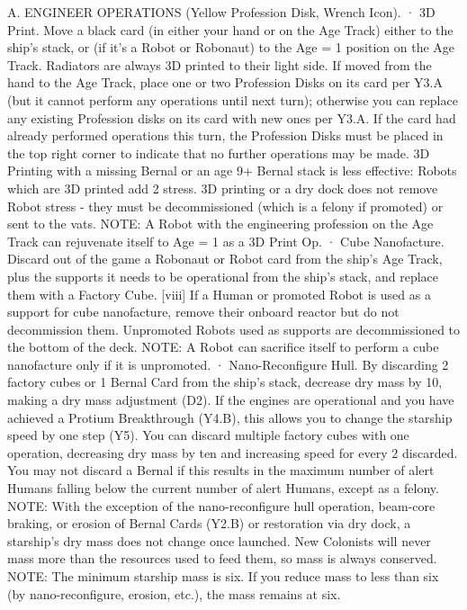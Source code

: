 \documentclass[a4paper]{book}
\begin{document}
A. ENGINEER OPERATIONS (Yellow Profession Disk, Wrench Icon).
·       3D Print. Move a black card (in either your hand or on the Age Track) either to the ship’s stack, or (if it’s a Robot or Robonaut) to the Age = 1 position on the Age Track. Radiators are always 3D printed to their light side. If moved from the hand to the Age Track, place one or two Profession Disks on its card per Y3.A (but it cannot perform any operations until next turn); otherwise you can replace any existing Profession disks on its card with new ones per Y3.A. If the card had already performed operations this turn, the Profession Disks must be placed in the top right corner to indicate that no further operations may be made. 3D Printing with a missing Bernal or an age 9+ Bernal stack is less effective: Robots which are 3D printed add 2 stress. 3D printing or a dry dock does not remove Robot stress - they must be decommissioned (which is a felony if promoted) or sent to the vats.
NOTE: A Robot with the engineering profession on the Age Track can rejuvenate itself to Age = 1 as a 3D Print Op.
·       Cube Nanofacture. Discard out of the game a Robonaut or Robot card from the ship’s Age Track, plus the supports it needs to be operational from the ship’s stack, and replace them with a Factory Cube. [viii] If a Human or promoted Robot is used as a support for cube nanofacture, remove their onboard reactor but do not decommission them. Unpromoted Robots used as supports are decommissioned to the bottom of the deck.
NOTE: A Robot can sacrifice itself to perform a cube nanofacture only if it is unpromoted.
·       Nano-Reconfigure Hull. By discarding 2 factory cubes or 1 Bernal Card from the ship’s stack, decrease dry mass by 10, making a dry mass adjustment (D2). If the engines are operational and you have achieved a Protium Breakthrough (Y4.B), this allows you to change the starship speed by one step (Y5). You can discard multiple factory cubes with one operation, decreasing dry mass by ten and increasing speed for every 2 discarded. You may not discard a Bernal if this results in the maximum number of alert Humans falling below the current number of alert Humans, except as a felony.
NOTE: With the exception of the nano-reconfigure hull operation, beam-core braking, or erosion of Bernal Cards (Y2.B) or restoration via dry dock, a starship's dry mass does not change once launched. New Colonists will never mass more than the resources used to feed them, so mass is always conserved.
NOTE: The minimum starship mass is six. If you reduce mass to less than six (by nano-reconfigure, erosion, etc.), the mass remains at six.
 
\end{document}
